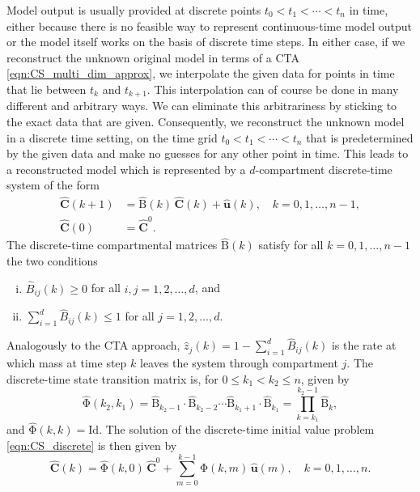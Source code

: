 \documentclass[11pt,a4paper]{article}
\renewcommand{\vec}[1]{\mathbf{#1}}
\newcommand{\tens}[1]{\mathrm{#1}}
\newcommand{\id}{\tens{Id}}
\newcommand{\suml}{\sum\limits}
\begin{document}
    Model output is usually provided at discrete points $t_0<t_1<\cdots<t_n$ in time, either because there is no feasible way to represent continuous-time model output or the model itself works on the basis of discrete time steps.
    In either case, if we reconstruct the unknown original model in terms of a CTA \eqref{eqn:CS_multi_dim_approx}, we interpolate the given data for points in time that lie between $t_k$ and $t_{k+1}$.
    This interpolation can of course be done in many different and arbitrary ways.
    We can eliminate this arbitrariness by sticking to the exact data that are given.
    Consequently, we reconstruct the unknown model in a discrete time setting, on the time grid $t_0<t_1<\cdots<t_n$ that is predetermined by the given data and make no guesses for any other point in time.
    This leads to a reconstructed model which is represented by a $d$-compartment discrete-time system of the form
    \begin{equation}\label{eqn:CS_discrete}
        \begin{aligned}
            \widehat{\vec{C}}(k+1) &= \widehat{\tens{B}}(k)\,\widehat{\vec{C}}(k) + \widehat{\vec{u}}(k),\quad k=0,1,\ldots,n-1,\\
            \widehat{\vec{C}}(0) &= \widehat{\vec{C}}^0.
        \end{aligned}
    \end{equation}
    The discrete-time compartmental matrices $\widehat{\tens{B}}(k)$ satisfy for all $k=0,1,\ldots,n-1$ the two conditions
    \begin{enumerate}[(i)]
        \item $\widehat{B}_{ij}(k)\geq0$ for all $i,j=1,2,\ldots,d$, and
        \item $\suml_{i=1}^d \widehat{B}_{ij}(k)\leq 1$ for all $j=1,2,\ldots,d$.
    \end{enumerate}
    Analogously to the CTA approach, $\widehat{z}_j(k)=1-\sum_{i=1}^d \widehat{B}_{ij}(k)$ is the rate at which mass at time step $k$ leaves the system through compartment $j$.
    The discrete-time state transition matrix is, for $0\leq k_1<k_2\leq n$, given by
    \begin{equation*}
        \widehat{\tens{\Phi}}(k_2,k_1) = \widehat{\tens{B}}_{k_2-1}\cdot\widehat{\tens{B}}_{k_2-2}\cdots\widehat{\tens{B}}_{k_1+1}\cdot\widehat{\tens{B}}_{k_1} = \prod\limits_{k=k_1}^{k_2-1}\widehat{\tens{B}}_k,
    \end{equation*}
    and $\widehat{\tens{\Phi}}(k,k)=\id$.
    The solution of the discrete-time initial value problem \eqref{eqn:CS_discrete} is then given by
    \begin{equation*}
        \widehat{\vec{C}}(k) = \widehat{\tens{\Phi}}(k,0)\,\widehat{\vec{C}}^0 + \suml_{m=0}^{k-1} \widehat{\tens{\Phi}}(k,m)\,\widehat{\vec{u}}(m),\quad k=0,1,\ldots,n.
    \end{equation*}
    
\end{document}

